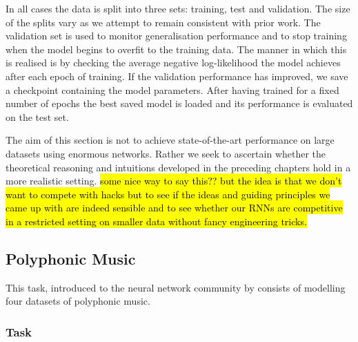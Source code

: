 In all cases the data is split into three sets: training, test and validation.
The size of the splits vary as we attempt to remain consistent with prior work.
The validation set is used to monitor generalisation performance and to stop
training when the model begins to overfit to the training data. The manner in
which this is realised is by checking the average negative log-likelihood the model
achieves after each epoch of training. If the validation performance has improved,
we save a checkpoint containing the model parameters. After having trained for
a fixed number of epochs the best saved model is loaded and its performance is
evaluated on the test set.

The aim of this section is not to achieve state-of-the-art performance on
large datasets using enormous networks. Rather we seek to ascertain whether the
theoretical reasoning and intuitions developed in the preceding chapters hold
in a more realistic setting. \hl{some nice way to say this?? but the idea is
that we don't want to compete with hacks but to see if the ideas and guiding
principles we came up with are indeed sensible and to see whether our RNNs are
competitive in a restricted setting on smaller data without fancy engineering
tricks.}

\subsection{Polyphonic Music}
This task, introduced to the neural network community by 
\autocite{Boulanger-Lewandowski2012} consists of modelling four datasets of
polyphonic music. 



\subsubsection{Task}



